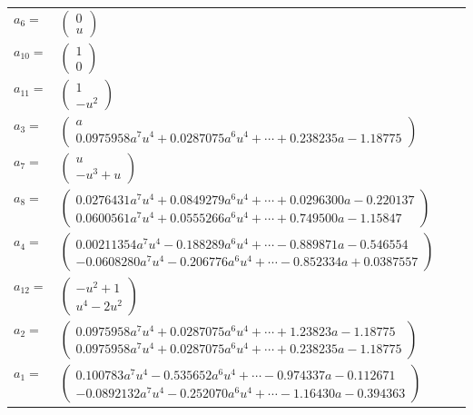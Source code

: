 \documentclass[1p]{elsarticle_modified}
\theoremstyle{definition}
\begin{document}
\begin{tabular}{m{7pt} m{180pt} m{7pt} m{180pt} }
\flushright $a_{6}=$&$\begin{pmatrix}0\\u\end{pmatrix}$ \\
\flushright $a_{10}=$&$\begin{pmatrix}1\\0\end{pmatrix}$ \\
\flushright $a_{11}=$&$\begin{pmatrix}1\\- u^2\end{pmatrix}$ \\
\flushright $a_{3}=$&$\begin{pmatrix}a\\0.0975958 a^{7} u^{4}+0.0287075 a^{6} u^{4}+\cdots+0.238235 a-1.18775\end{pmatrix}$ \\
\flushright $a_{7}=$&$\begin{pmatrix}u\\- u^3+u\end{pmatrix}$ \\
\flushright $a_{8}=$&$\begin{pmatrix}0.0276431 a^{7} u^{4}+0.0849279 a^{6} u^{4}+\cdots+0.0296300 a-0.220137\\0.0600561 a^{7} u^{4}+0.0555266 a^{6} u^{4}+\cdots+0.749500 a-1.15847\end{pmatrix}$ \\
\flushright $a_{4}=$&$\begin{pmatrix}0.00211354 a^{7} u^{4}-0.188289 a^{6} u^{4}+\cdots-0.889871 a-0.546554\\-0.0608280 a^{7} u^{4}-0.206776 a^{6} u^{4}+\cdots-0.852334 a+0.0387557\end{pmatrix}$ \\
\flushright $a_{12}=$&$\begin{pmatrix}- u^2+1\\u^4-2 u^2\end{pmatrix}$ \\
\flushright $a_{2}=$&$\begin{pmatrix}0.0975958 a^{7} u^{4}+0.0287075 a^{6} u^{4}+\cdots+1.23823 a-1.18775\\0.0975958 a^{7} u^{4}+0.0287075 a^{6} u^{4}+\cdots+0.238235 a-1.18775\end{pmatrix}$ \\
\flushright $a_{1}=$&$\begin{pmatrix}0.100783 a^{7} u^{4}-0.535652 a^{6} u^{4}+\cdots-0.974337 a-0.112671\\-0.0892132 a^{7} u^{4}-0.252070 a^{6} u^{4}+\cdots-1.16430 a-0.394363\end{pmatrix}$ \\

\end{tabular}
\end{document}

